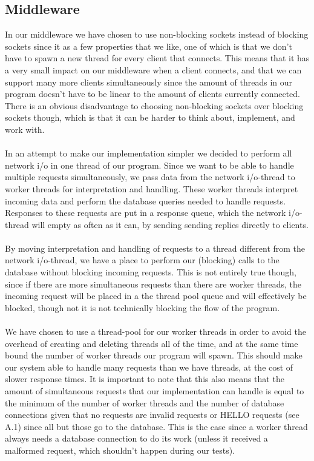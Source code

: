 \documentclass{article}
\begin{document}
        \subsection{Middleware}
            \label{sec:description_middleware}
            In our middleware we have chosen to use non-blocking sockets instead of blocking sockets since it as a few properties that we like, one of which is that we don't have to spawn a new thread for every client that connects. This means that it has a very small impact on our middleware when a client connects, and that we can support many more clients simultaneously since the amount of threads in our program doesn't have to be linear to the amount of clients currently connected. There is an obvious disadvantage to choosing non-blocking sockets over blocking sockets though, which is that it can be harder to think about, implement, and work with.\\
            \\
            In an attempt to make our implementation simpler we decided to perform all network i/o in one thread of our program. Since we want to be able to handle multiple requests simultaneously, we pass data from the network i/o-thread to worker threads for interpretation and handling. These worker threads interpret incoming data and perform the database queries needed to handle requests. Responses to these requests are put in a response queue, which the network i/o-thread will empty as often as it can, by sending sending replies directly to clients.\\
            \\
            By moving interpretation and handling of requests to a thread different from the network i/o-thread, we have a place to perform our (blocking) calls to the database without blocking incoming requests. This is not entirely true though, since if there are more simultaneous requests than there are worker threads, the incoming request will be placed in a the thread pool queue and will effectively be blocked, though not it is not technically blocking the flow of the program.\\
            \\
            We have chosen to use a thread-pool for our worker threads in order to avoid the overhead of creating and deleting threads all of the time, and at the same time bound the  number of worker threads our program will spawn. This should make our system able to handle many requests than we have threads, at the cost of slower response times. It is important to note that this also means that the amount of simultaneous requests that our implementation can handle is equal to the minimum of the number of worker threads and the number of database connections given that no requests are invalid requests or HELLO requests (see A.1) since all but those go to the database. This is the case since a worker thread always needs a database connection to do its work (unless it received a malformed request, which shouldn't happen during our tests).\\
\end{document}
